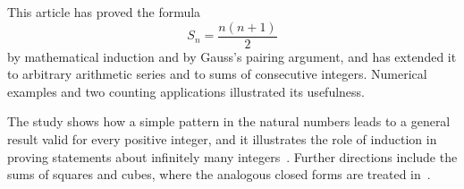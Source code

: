 \documentclass[12pt,a4paper]{article}
\theoremstyle{definition}
\begin{document}
This article has proved the formula
\[
S_n=\frac{n(n+1)}{2}
\]
by mathematical induction and by Gauss's pairing argument, and has extended it to arbitrary arithmetic series and to sums of consecutive integers. Numerical examples and two counting applications illustrated its usefulness.
 
The study shows how a simple pattern in the natural numbers leads to a general result valid for every positive integer, and it illustrates the role of induction in proving statements about infinitely many integers~\cite{rosen}. Further directions include the sums of squares and cubes, where the analogous closed forms are treated in~\cite{graham}. %
 


 
\end{document}
